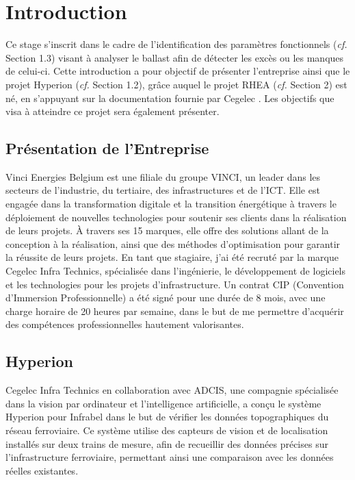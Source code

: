 
\section{Introduction}
Ce stage s'inscrit dans le cadre de l'identification des paramètres fonctionnels (\textit{cf.} Section 1.3) visant à analyser le ballast afin de détecter les excès ou les manques de celui-ci. Cette introduction a pour objectif de présenter l'entreprise ainsi que le projet Hyperion (\textit{cf.} Section 1.2), grâce auquel le projet RHEA (\textit{cf.} Section 2) est né, en s'appuyant sur la documentation fournie par Cegelec \cite{Hyperion-interface}. Les objectifs que visa à atteindre ce projet sera également présenter.

\subsection{Présentation de l'Entreprise}

Vinci Energies Belgium est une filiale du groupe VINCI, un leader dans les secteurs de l'industrie, du tertiaire, des infrastructures et de l'ICT. Elle est engagée dans la transformation digitale et la transition énergétique à travers le déploiement de nouvelles technologies pour soutenir ses clients dans la réalisation de leurs projets. À travers ses 15 marques, elle offre des solutions allant de la conception à la réalisation, ainsi que des méthodes d'optimisation pour garantir la réussite de leurs projets. En tant que stagiaire, j'ai été recruté par la marque Cegelec Infra Technics, spécialisée dans l'ingénierie, le développement de logiciels et les technologies pour les projets d'infrastructure. Un contrat CIP (Convention d'Immersion Professionnelle) a été signé pour une durée de 8 mois, avec une charge horaire de 20 heures par semaine, dans le but de me permettre d'acquérir des compétences professionnelles hautement valorisantes. 

\subsection{Hyperion}

Cegelec Infra Technics en collaboration avec ADCIS, une compagnie spécialisée dans la vision par ordinateur et l'intelligence artificielle, a conçu le système Hyperion pour Infrabel dans le but de vérifier les données topographiques du réseau ferroviaire. Ce système utilise des capteurs de vision et de localisation installés sur deux trains de mesure, afin de recueillir des données précises sur l'infrastructure ferroviaire, permettant ainsi une comparaison avec les données réelles existantes. \\

